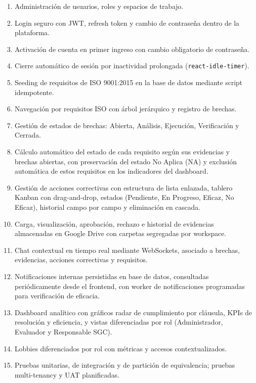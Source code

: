 \documentclass[final]{udpthesis}
\begin{document}
\begin{enumerate}
    \item Administración de usuarios, roles y espacios de trabajo.
    \item Login seguro con JWT, refresh token y cambio de contraseña dentro de la plataforma.
    \item Activación de cuenta en primer ingreso con cambio obligatorio de contraseña.
    \item Cierre automático de sesión por inactividad prolongada (\texttt{react-idle-timer}).
    \item Seeding de requisitos de ISO 9001:2015 en la base de datos mediante script idempotente.
    \item Navegación por requisitos ISO con árbol jerárquico y registro de brechas.
    \item Gestión de estados de brechas: Abierta, Análisis, Ejecución, Verificación y Cerrada.
    \item Cálculo automático del estado de cada requisito según sus evidencias y brechas abiertas, con preservación del estado No Aplica (NA) y exclusión automática de estos requisitos en los indicadores del dashboard.
    \item Gestión de acciones correctivas con estructura de lista enlazada, tablero Kanban con drag-and-drop, estados (Pendiente, En Progreso, Eficaz, No Eficaz), historial campo por campo y eliminación en cascada.
    \item Carga, visualización, aprobación, rechazo e historial de evidencias almacenadas en Google Drive con carpetas segregadas por workspace.
    \item Chat contextual en tiempo real mediante WebSockets, asociado a brechas, evidencias, acciones correctivas y requisitos.
    \item Notificaciones internas persistidas en base de datos, consultadas periódicamente desde el frontend, con worker de notificaciones programadas para verificación de eficacia.
    \item Dashboard analítico con gráficos radar de cumplimiento por cláusula, KPIs de resolución y eficiencia, y vistas diferenciadas por rol (Administrador, Evaluador y Responsable SGC).
    \item Lobbies diferenciados por rol con métricas y accesos contextualizados.
    \item Pruebas unitarias, de integración y de partición de equivalencia; pruebas multi-tenancy y UAT planificadas.
\end{enumerate}
\end{document}
